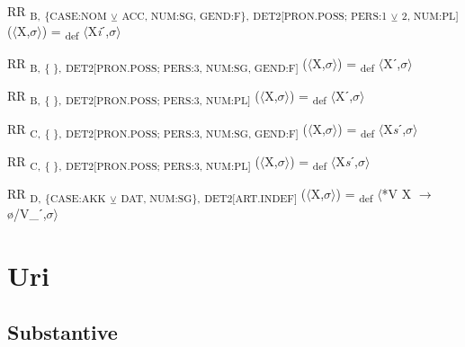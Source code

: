{\begin{exe}
 RR \textsubscript{B,} \textsubscript{\{CASE:NOM} \textsubscript{${\veebar}$}\textsubscript{  ACC, NUM:SG, GEND:F\},} \textsubscript{DET2[PRON.POSS; PERS:1} \textsubscript{${\veebar}$}\textsubscript{ 2, NUM:PL]} ($\langle$X,$\sigma $$\rangle$) = \textsubscript{def} $\langle$X\textit{i}ˊ,$\sigma $$\rangle$
\end{exe}

\noindent
\begin{styleNoSpacing}\begin{exe}
 RR \textsubscript{B,} \textsubscript{\{ \},} \textsubscript{DET2[PRON.POSS; PERS:3, NUM:SG, GEND:F]} ($\langle$X,$\sigma $$\rangle$) = \textsubscript{def} $\langle$Xˊ,$\sigma $$\rangle$
\end{exe}

\begin{exe}
 RR \textsubscript{B,} \textsubscript{\{ \},} \textsubscript{DET2[PRON.POSS; PERS:3, NUM:PL]} ($\langle$X,$\sigma $$\rangle$) = \textsubscript{def} $\langle$Xˊ,$\sigma $$\rangle$
\end{exe}

\begin{exe}
 RR \textsubscript{C,} \textsubscript{\{ \},} \textsubscript{DET2[PRON.POSS; PERS:3, NUM:SG, GEND:F]} ($\langle$X,$\sigma $$\rangle$) = \textsubscript{def} $\langle$X\textit{s}ˊ,$\sigma $$\rangle$
\end{exe}

\begin{exe}
 RR \textsubscript{C,} \textsubscript{\{ \},} \textsubscript{DET2[PRON.POSS; PERS:3, NUM:PL]} ($\langle$X,$\sigma $$\rangle$) = \textsubscript{def} $\langle$X\textit{s}ˊ,$\sigma $$\rangle$
\end{exe}

\begin{exe}
 RR \textsubscript{D,} \textsubscript{\{CASE:AKK} \textsubscript{${\veebar}$}\textsubscript{ DAT, NUM:SG\},} \textsubscript{DET2[ART.INDEF]} ($\langle$X,$\sigma $$\rangle$) = \textsubscript{def} $\langle$*V X $\rightarrow$ ø/V\_ˊ,$\sigma $$\rangle$
\end{exe}

\section{Uri}

\subsection{Substantive}


\end{styleNoSpacing}}
